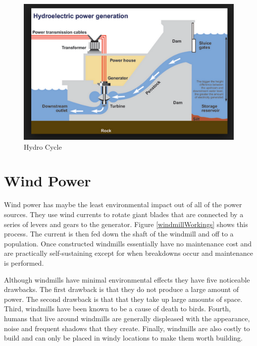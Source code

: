 \documentclass[msc,oneside]{ubcthesis}%
\begin{document}
\begin{figure}[hbt]\label{hydroCycle}
  \begin{center}
    \includegraphics[width=1\textwidth]{hydro}
    \caption[Hydro Cycle]{Hydro Cycle }
  \end{center}
\end{figure}

\newpage

\section{Wind Power}

Wind power has maybe the least environmental impact out of all of the power sources. They use wind currents to rotate giant blades that are connected by a series of levers and gears to the generator. Figure \ref{windmillWorkings} shows this process. The current is then fed down the shaft of the windmill and off to a population. Once constructed windmills essentially have no maintenance cost and are practically self-sustaining except for when breakdowns occur and maintenance is performed. 

Although windmills have minimal environmental effects they have five noticeable drawbacks. The first drawback is that they do not produce a large amount of power. The second drawback is that that they take up large amounts of space. Third, windmills have been known to be a cause of death to birds. Fourth, humans that live around windmills are generally displeased with the appearance, noise and frequent shadows that they create. Finally, windmills are also costly to build and can only be placed in windy locations to make them worth building. 
\bigskip
\end{document}
